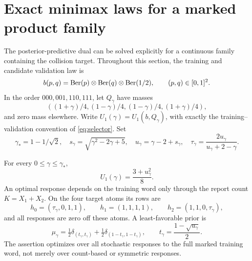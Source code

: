 \section{Exact minimax laws for a marked product family}
\label{sec:marked-exact}
The posterior-predictive dual can be solved explicitly for a continuous
family containing the collision target. Throughout this section, the
training and candidate validation law is
\[
 b(p,q)=\operatorname{Ber}(p)\otimes\operatorname{Ber}(q)\otimes\operatorname{Ber}(1/2),\qquad (p,q)\in[0,1]^2.
\]
In the order $000,001,110,111$, let $Q_\gamma$ have masses
\[
 ((1+\gamma)/4,(1-\gamma)/4,(1-\gamma)/4,(1+\gamma)/4),
\]
and zero mass elsewhere. Write $U_1(\gamma)=U_1(b,Q_\gamma)$, with
exactly the training--validation convention of \eqref{eq:selector}.
Set
\begin{equation}\label{eq:marked-constants}
 \gamma_*=1-1/\sqrt2,\quad s_\gamma=\sqrt{\gamma^2-2\gamma+5},\quad
 u_\gamma=\gamma-2+s_\gamma,\quad
 \tau_\gamma=\frac{2u_\gamma}{u_\gamma+2-\gamma}.
\end{equation}

\begin{theorem}\label{thm:marked-exact}
For every $0\le\gamma\le\gamma_*$,
\begin{equation}\label{eq:marked-value}
 U_1(\gamma)=\frac{3+u_\gamma^2}{8}.
\end{equation}
An optimal response depends on the training word only through the report
count $K=X_1+X_2$. On the four target atoms its rows are
\begin{equation}\label{eq:marked-response}
 h_0=(\tau_\gamma,0,1,1),\qquad h_1=(1,1,1,1),\qquad
 h_2=(1,1,0,\tau_\gamma),
\end{equation}
and all responses are zero off these atoms. A least-favorable prior is
\begin{equation}\label{eq:marked-prior}
 \mu_\gamma=\tfrac12\delta_{(t_\gamma,t_\gamma)}
             +\tfrac12\delta_{(1-t_\gamma,1-t_\gamma)},\qquad
 t_\gamma=\frac{1-\sqrt{u_\gamma}}2.
\end{equation}
The assertion optimizes over all stochastic responses to the full marked
training word, not merely over count-based or symmetric responses.
\end{theorem}

